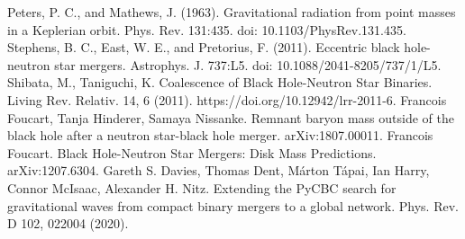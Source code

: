\documentclass[binding=0.6cm, LaM]{sapthesis}
\begin{document}
\begin{thebibliography}{500}
	 Peters, P. C., and Mathews, J. (1963). Gravitational radiation from point masses in a Keplerian orbit. Phys. Rev. 131:435. doi: 10.1103/PhysRev.131.435.
	 Stephens, B. C., East, W. E., and Pretorius, F. (2011). Eccentric black hole-neutron star mergers. Astrophys. J. 737:L5. doi: 10.1088/2041-8205/737/1/L5.
	 Shibata, M., Taniguchi, K. Coalescence of Black Hole-Neutron Star Binaries. Living Rev. Relativ. 14, 6 (2011). https://doi.org/10.12942/lrr-2011-6.
	 Francois Foucart, Tanja Hinderer, Samaya Nissanke. Remnant baryon mass outside of the black hole after a neutron star-black hole merger. arXiv:1807.00011.
	 Francois Foucart. Black Hole-Neutron Star Mergers: Disk Mass Predictions. arXiv:1207.6304.
	 Gareth S. Davies, Thomas Dent, Márton Tápai, Ian Harry, Connor McIsaac, Alexander H. Nitz. Extending the PyCBC search for gravitational waves from compact binary mergers to a global network. Phys. Rev. D 102, 022004 (2020).

\end{thebibliography}

\printbibliography
\end{document}
